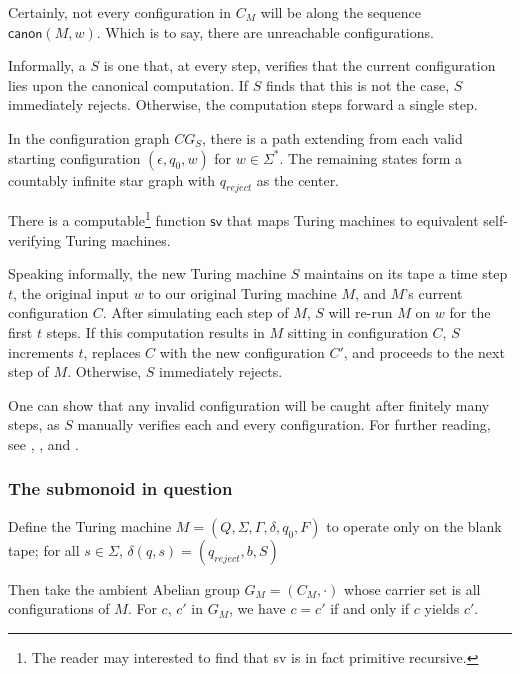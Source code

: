 \documentclass[11pt, titlepage]{article}
\begin{document}
Certainly, not every configuration in $C_M$ will be along the sequence
$\textsf{canon}(M,w)$. Which is to say, there are unreachable
configurations.

Informally, a  $S$ is one that, at
every step, verifies that the current configuration lies upon the
canonical computation. If $S$ finds that this is not the case, $S$
immediately rejects. Otherwise, the computation steps forward a single
step.

In the configuration graph $CG_S$, there is a path extending from each
valid starting configuration $(\epsilon, q_0, w)$ for
$w \in \Sigma^*$. The remaining states form a countably infinite star
graph with $q_{reject}$ as the center.

\begin{proposition}
  There is a computable\footnote{The reader may interested to find
    that \textsf{sv} is in fact primitive recursive.} function
  $\textsf{sv}$ that maps Turing machines to equivalent self-verifying
  Turing machines.
\end{proposition}

Speaking informally, the new Turing machine $S$ maintains on its tape
a time step $t$, the original input $w$ to our original Turing machine
$M$, and $M$'s current configuration $C$. After simulating each step
of $M$, $S$ will re-run $M$ on $w$ for the first $t$ steps. If this
computation results in $M$ sitting in configuration $C$, $S$
increments $t$, replaces $C$ with the new configuration $C'$, and
proceeds to the next step of $M$. Otherwise, $S$ immediately rejects.

One can show that any invalid configuration will be caught after
finitely many steps, as $S$ manually verifies each and every
configuration. For further reading, see \cite{davis:note_utm},
\cite{davis:defn_utm}, and \cite{shepherdson:machine_config}.

\subsubsection*{The submonoid in question}
Define the Turing machine $M = (Q, \Sigma, \Gamma, \delta, q_0, F)$ to
operate only on the blank tape; for all $s \in \Sigma$,
$\delta(q, s) = (q_{reject}, b, S)$


Then take the ambient Abelian group $G_M = (C_M, \cdot)$ whose carrier
set is all configurations of $M$. For $c$, $c'$ in $G_M$, we have
$c = c'$ if and only if $c$ yields $c'$.
\end{document}

